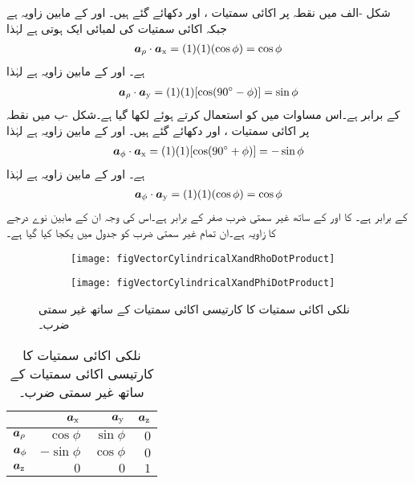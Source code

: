 شکل -الف میں نقطہ  پر اکائی سمتیات ،  اور  دکھائے گئے ہیں۔ اور   کے مابین زاویہ  ہے جبکہ اکائی سمتیات کی لمبائی ایک ہوتی ہے لہٰذا
\begin{align}
{\boldsymbol{a}}_{\rho} \cdot {\boldsymbol{a}}_{\textup{x}}=(1)(1)(\cos \phi)=\cos \phi
\end{align}
ہے۔ اور   کے مابین زاویہ  ہے  لہٰذا
\begin{align}
{\boldsymbol{a}}_{\rho} \cdot {\boldsymbol{a}}_{\textup{y}}=(1)(1)[\cos (90^\circ-\phi)]=\sin \phi
\end{align}
کے برابر ہے۔اس مساوات میں  کو استعمال کرتے ہوئے  لکھا گیا ہے۔شکل -ب میں نقطہ  پر اکائی سمتیات ،  اور  دکھائے گئے ہیں۔ اور   کے مابین زاویہ  ہے  لہٰذا
\begin{align}
{\boldsymbol{a}}_{\phi} \cdot {\boldsymbol{a}}_{\textup{x}}=(1)(1)[\cos (90^\circ+\phi)]=-\sin \phi
\end{align}
ہے۔ اور   کے مابین زاویہ  ہے  لہٰذا
\begin{align}
{\boldsymbol{a}}_{\phi} \cdot {\boldsymbol{a}}_{\textup{y}}=(1)(1)(\cos \phi)=\cos \phi
\end{align}
کے برابر ہے۔ کا  اور  کے ساتھ غیر سمتی ضرب صفر کے برابر ہے۔اس کی وجہ ان کے مابین نوے درجے کا زاویہ ہے۔ان تمام غیر سمتی ضرب کو جدول  میں یکجا کیا گیا ہے۔
\begin{figure}
\centering
\begin{subfigure}{0.5\textwidth}
\centering
\texttt{[image: figVectorCylindricalXandRhoDotProduct]}
\end{subfigure}%
%
\begin{subfigure}{0.5\textwidth}
\centering
\texttt{[image: figVectorCylindricalXandPhiDotProduct]}
\end{subfigure}%
\caption{نلکی اکائی سمتیات کا کارتیسی اکائی سمتیات کے ساتھ غیر سمتی ضرب۔}
\label{شکل_سمتیہ_نلکی_کارتیسی_اکائی_غیر_سمتی_ضرب}
\end{figure}%
%
%
\begin{table}
\caption{نلکی اکائی سمتیات کا کارتیسی اکائی سمتیات کے ساتھ غیر سمتی ضرب۔}
\centering
\begin{tabular}{l | r r r}
 & ${\boldsymbol{a}}_{\textup{x}}$ & ${\boldsymbol{a}}_{\textup{y}}$ & ${\boldsymbol{a}}_{\textup{z}}$ \\
\hline
${\boldsymbol{a}}_{\rho}$ & $\cos \phi$ & $\sin \phi $& $0$\\
${\boldsymbol{a}}_{\phi}$ &$-\sin \phi$ &$ \cos \phi$ &$ 0$\\
${\boldsymbol{a}}_{\textup{z}}$ & $0$ &$ 0$ &$1$
\end{tabular}
\label{جدول_سمتیہ_نلکی_کارتیسی_اکائی_غیر-سمتی_ضرب}
\end{table}
